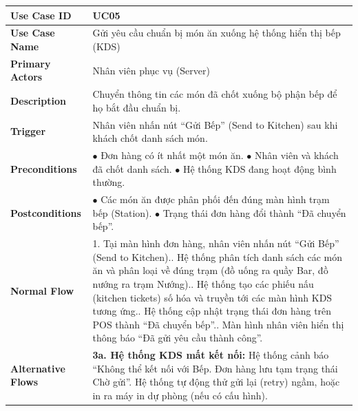 \documentclass[12pt,a4paper]{article}
\begin{document}
\begin{longtable}{|L{3.5cm}|L{12.5cm}|}
\hline
\textbf{Use Case ID} & UC05 \\ \hline
\textbf{Use Case Name} & Gửi yêu cầu chuẩn bị món ăn xuống hệ thống hiển thị bếp (KDS) \\ \hline
\textbf{Primary Actors} & Nhân viên phục vụ (Server) \\ \hline
\textbf{Description} & Chuyển thông tin các món đã chốt xuống bộ phận bếp để họ bắt đầu chuẩn bị. \\ \hline
\textbf{Trigger} & Nhân viên nhấn nút ``Gửi Bếp'' (Send to Kitchen) sau khi khách chốt danh sách món. \\ \hline
\textbf{Preconditions} &
$\bullet$ Đơn hàng có ít nhất một món ăn.\newline
$\bullet$ Nhân viên và khách đã chốt danh sách.\newline
$\bullet$ Hệ thống KDS đang hoạt động bình thường. \\ \hline
\textbf{Postconditions} &
$\bullet$ Các món ăn được phân phối đến đúng màn hình trạm bếp (Station).\newline
$\bullet$ Trạng thái đơn hàng đổi thành ``Đã chuyển bếp''. \\ \hline
\textbf{Normal Flow} &
1. Tại màn hình đơn hàng, nhân viên nhấn nút ``Gửi Bếp'' (Send to Kitchen).. Hệ thống phân tích danh sách các món ăn và phân loại về đúng trạm (đồ uống ra quầy Bar, đồ nướng ra trạm Nướng).. Hệ thống tạo các phiếu nấu (kitchen tickets) số hóa và truyền tới các màn hình KDS tương ứng.. Hệ thống cập nhật trạng thái đơn hàng trên POS thành ``Đã chuyển bếp''.. Màn hình nhân viên hiển thị thông báo ``Đã gửi yêu cầu thành công''. \\ \hline
\textbf{Alternative Flows} &
\textbf{3a. Hệ thống KDS mất kết nối:} Hệ thống cảnh báo ``Không thể kết nối với Bếp. Đơn hàng lưu tạm trạng thái Chờ gửi''. Hệ thống tự động thử gửi lại (retry) ngầm, hoặc in ra máy in dự phòng (nếu có cấu hình). \\ \hline
\end{longtable}
\end{document}
